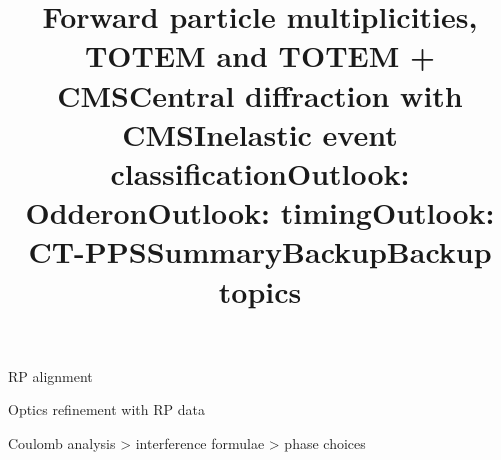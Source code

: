 \newpage %
\title{Forward particle multiplicities, TOTEM and TOTEM + CMS}


\newpage %
\title{}


\newpage %
\title{}


\newpage %
\title{Central diffraction with CMS}


\newpage %
\title{}


\newpage %
\title{}


\newpage %
\title{Inelastic event classification}


\newpage %
\title{}

\newpage %
\title{Outlook: Odderon}


\newpage %
\title{Outlook: timing}


\newpage %
\title{}


\newpage %
\title{Outlook: CT-PPS}


\newpage %
\title{}


\newpage %
\title{Summary}


\newpage %
\hbox{}%
\vfil
\title{Backup}


\newpage %
\title{Backup topics}

\> RP alignment

\> Optics refinement with RP data

\> Coulomb analysis
\>> interference formulae
\>> phase choices

\vfil
\eject
\bye
